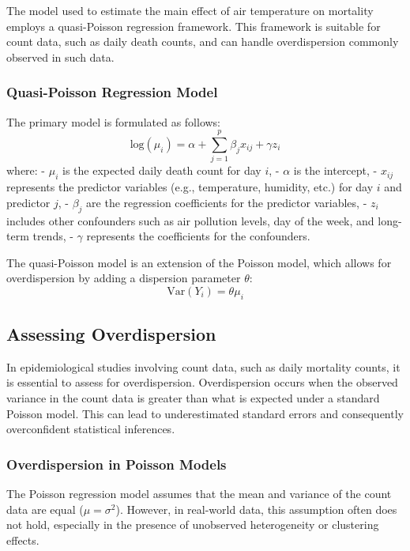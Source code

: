 \documentclass[
]{krantz}
\begin{document}
The model used to estimate the main effect of air temperature on mortality employs a quasi-Poisson regression framework. This framework is suitable for count data, such as daily death counts, and can handle overdispersion commonly observed in such data.\citep{engelhardt2013}

\subsubsection{Quasi-Poisson Regression Model}\label{quasi-poisson-regression-model}

The primary model is formulated as follows:
\[ \text{log}(\mu_i) = \alpha + \sum_{j=1}^{p} \beta_j x_{ij} + \gamma z_i \]
where:
- \(\mu_i\) is the expected daily death count for day \(i\),
- \(\alpha\) is the intercept,
- \(x_{ij}\) represents the predictor variables (e.g., temperature, humidity, etc.) for day \(i\) and predictor \(j\),
- \(\beta_j\) are the regression coefficients for the predictor variables,
- \(z_i\) includes other confounders such as air pollution levels, day of the week, and long-term trends,
- \(\gamma\) represents the coefficients for the confounders.

The quasi-Poisson model is an extension of the Poisson model, which allows for overdispersion by adding a dispersion parameter \(\theta\):
\[ \text{Var}(Y_i) = \theta \mu_i \]

\subsection{Assessing Overdispersion}\label{assessing-overdispersion}

In epidemiological studies involving count data, such as daily mortality counts, it is essential to assess for overdispersion. Overdispersion occurs when the observed variance in the count data is greater than what is expected under a standard Poisson model. This can lead to underestimated standard errors and consequently overconfident statistical inferences.

\subsubsection{Overdispersion in Poisson Models}\label{overdispersion-in-poisson-models}

The Poisson regression model assumes that the mean and variance of the count data are equal (\(\mu = \sigma^2\)). However, in real-world data, this assumption often does not hold, especially in the presence of unobserved heterogeneity or clustering effects.
\end{document}
